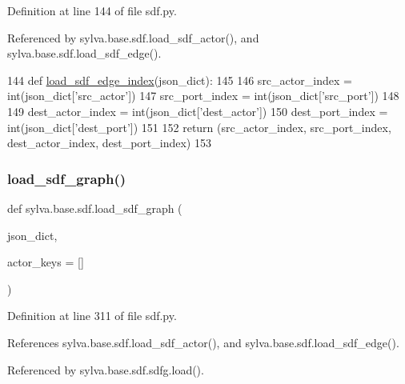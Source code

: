 Definition at line 144 of file sdf.\+py.



Referenced by sylva.\+base.\+sdf.\+load\+\_\+sdf\+\_\+actor(), and sylva.\+base.\+sdf.\+load\+\_\+sdf\+\_\+edge().


\begin{DoxyCode}
144     \textcolor{keyword}{def }\hyperlink{namespacesylva_1_1base_1_1sdf_a67886f481ab9be68797400241d754f64}{load\_sdf\_edge\_index}(json\_dict):
145 
146         src\_actor\_index = int(json\_dict[\textcolor{stringliteral}{'src\_actor'}])
147         src\_port\_index = int(json\_dict[\textcolor{stringliteral}{'src\_port'}])
148 
149         dest\_actor\_index = int(json\_dict[\textcolor{stringliteral}{'dest\_actor'}])
150         dest\_port\_index = int(json\_dict[\textcolor{stringliteral}{'dest\_port'}])
151 
152         \textcolor{keywordflow}{return} (src\_actor\_index, src\_port\_index, dest\_actor\_index, dest\_port\_index)
153 
\end{DoxyCode}
\mbox{\label{namespacesylva_1_1base_1_1sdf_a0bdfa7a81bf9648662631113a609062d}} 
\subsubsection{\texorpdfstring{load\+\_\+sdf\+\_\+graph()}{load\_sdf\_graph()}}
{\footnotesize\ttfamily def sylva.\+base.\+sdf.\+load\+\_\+sdf\+\_\+graph (\begin{DoxyParamCaption}\item[{}]{json\+\_\+dict,  }\item[{}]{actor\+\_\+keys = {\ttfamily \mbox{[}\mbox{]}} }\end{DoxyParamCaption})}



Definition at line 311 of file sdf.\+py.



References sylva.\+base.\+sdf.\+load\+\_\+sdf\+\_\+actor(), and sylva.\+base.\+sdf.\+load\+\_\+sdf\+\_\+edge().



Referenced by sylva.\+base.\+sdf.\+sdfg.\+load().


